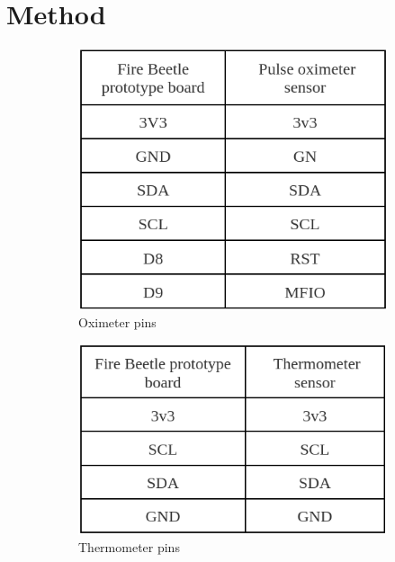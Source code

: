 \documentclass[10pt, conference]{IEEEtran}
\begin{document}
\section{Method}
\begin{figure}[t]
    \centering
    \begin{subfigure}[b]{.3\linewidth}
        \centering
        \includegraphics[width=.9\linewidth]{resources/pin-connections-oximeter.png}
        \caption{Oximeter pins}
        \label{fig:pin-oximeter}
    \end{subfigure}%
    \begin{subfigure}[b]{.3\linewidth}
        \centering
        \includegraphics[width=.9\linewidth]{resources/pin-therm.png}
        \caption{Thermometer pins}
        \label{fig:pin-therm}
    \end{subfigure}%
    \begin{subfigure}[b]{.3\linewidth}
        \centering

\end{subfigure}
\end{figure}
\end{document}
